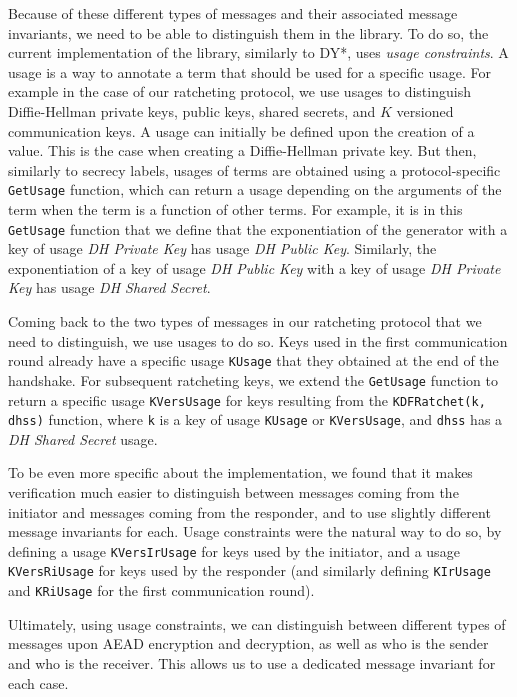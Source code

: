 Because of these different types of messages and their associated message invariants, we need to be able to distinguish them in the library.
To do so, the current implementation of the library, similarly to DY*, uses \emph{usage constraints}.
A usage is a way to annotate a term that should be used for a specific usage.
For example in the case of our ratcheting protocol, we use usages to distinguish Diffie-Hellman private keys, public keys, shared secrets, and $K$ versioned communication keys.
A usage can initially be defined upon the creation of a value. This is the case when creating a Diffie-Hellman private key.
But then, similarly to secrecy labels, usages of terms are obtained using a protocol-specific \texttt{GetUsage} function, which can return a usage depending on the arguments of the term when the term is a function of other terms.
For example, it is in this \texttt{GetUsage} function that we define that the exponentiation of the generator with a key of usage \emph{DH Private Key} has usage \emph{DH Public Key}.
Similarly, the exponentiation of a key of usage \emph{DH Public Key} with a key of usage \emph{DH Private Key} has usage \emph{DH Shared Secret}.

Coming back to the two types of messages in our ratcheting protocol that we need to distinguish, we use usages to do so.
Keys used in the first communication round already have a specific usage \texttt{KUsage} that they obtained at the end of the handshake.
For subsequent ratcheting keys, we extend the \texttt{GetUsage} function to return a specific usage \texttt{KVersUsage} for keys resulting from the \texttt{KDFRatchet(k, dhss)} function, where \texttt{k} is a key of usage \texttt{KUsage} or \texttt{KVersUsage}, and \texttt{dhss} has a \emph{DH Shared Secret} usage.

To be even more specific about the implementation, we found that it makes verification much easier to distinguish between messages coming from the initiator and messages coming from the responder, and to use slightly different message invariants for each.
Usage constraints were the natural way to do so, by defining a usage \texttt{KVersIrUsage} for keys used by the initiator, and a usage \texttt{KVersRiUsage} for keys used by the responder (and similarly defining \texttt{KIrUsage} and \texttt{KRiUsage} for the first communication round).

Ultimately, using usage constraints, we can distinguish between different types of messages upon AEAD encryption and decryption, as well as who is the sender and who is the receiver. This allows us to use a dedicated message invariant for each case.


